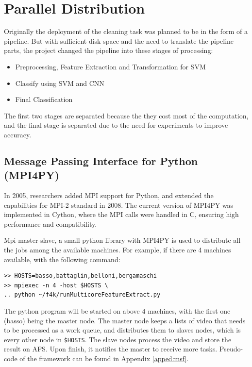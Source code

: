\documentclass[bsc,logo,twoside,fullspacing,parskip]{infthesis}
\begin{document}

\chapter{Parallel Distribution}
\label{chap:parallel}

Originally the deployment of the cleaning task was planned to be in the form of a pipeline.
But with sufficient disk space and the need to translate the pipeline parts, the project changed the pipeline into these stages of processing:

\begin{itemize}
   \setlength{\parskip}{3pt}
   \item Preprocessing, Feature Extraction and Transformation for SVM
   \item Classify using SVM and CNN
   \item Final Classification
\end{itemize}
The first two stages are separated because the they cost most of the computation, and the final stage is separated due to the need for experiments to improve accuracy.

\section{Message Passing Interface for Python (MPI4PY)}

In 2005, researchers added MPI support for Python\cite{MPI4PY}, and extended the capabilities for MPI-2 standard in 2008\cite{MPI4PY2}. The current version of MPI4PY\cite{MPI4PY3} was implemented in Cython, where the MPI calls were handled in C, ensuring high performance and compatibility.

Mpi-master-slave\cite{L5}, a small python library with MPI4PY is used to distribute all the jobs among the available machines. 
For example, if there are 4 machines available, with the following command: 
\lstset{basicstyle=\footnotesize\ttfamily,breaklines=true}
\begin{lstlisting}[frame=single]
>> HOSTS=basso,battaglin,belloni,bergamaschi
>> mpiexec -n 4 -host $HOSTS \
.. python ~/f4k/runMulticoreFeatureExtract.py
\end{lstlisting}
The python program will be started on above 4 machines, with the first one (basso) being the master node.
The master node keeps a lists of video that needs to be processed as a work queue, and distributes them to slaves nodes, which is every other node in {\tt \$HOSTS}. 
The slave nodes process the video and store the result on AFS. Upon finish, it notifies the master to receive more tasks. Pseudo-code of the framework can be found in Appendix \ref{apped:msf}.
\end{document}
